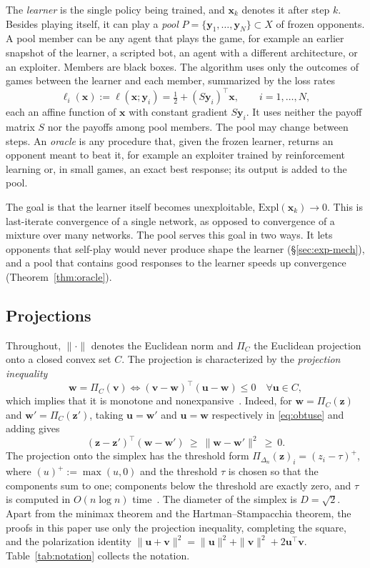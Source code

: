 \documentclass{article}
\theoremstyle{plain}
\theoremstyle{remark}
\newcommand{\Expl}{\mathrm{Expl}}
\newcommand{\Proj}{\Pi}
\newcommand{\simplex}{\Delta}
\newcommand{\bx}{{\bm{x}}}
\newcommand{\by}{{\bm{y}}}
\newcommand{\bv}{{\bm{v}}}
\newcommand{\bw}{{\bm{w}}}
\newcommand{\bz}{{\bm{z}}}
\newcommand{\bu}{{\bm{u}}}
\begin{document}
The \emph{learner} is the single policy being trained, and $\bx_k$ denotes it after step $k$. Besides playing itself, it can play a \emph{pool} $P=\{\by_1,\dots,\by_N\}\subset X$ of frozen opponents. A pool member can be any agent that plays the game, for example an earlier snapshot of the learner, a scripted bot, an agent with a different architecture, or an exploiter. Members are black boxes. The algorithm uses only the outcomes of games between the learner and each member, summarized by the loss rates
\[
\ell_i(\bx):=\ell(\bx;\by_i)=\tfrac12+(S\by_i)^\top\bx ,\qquad i=1,\dots,N,
\]
each an affine function of $\bx$ with constant gradient $S\by_i$. It uses neither the payoff matrix $S$ nor the payoffs among pool members. The pool may change between steps. An \emph{oracle} is any procedure that, given the frozen learner, returns an opponent meant to beat it, for example an exploiter trained by reinforcement learning or, in small games, an exact best response; its output is added to the pool.

The goal is that the learner itself becomes unexploitable, $\Expl(\bx_k)\to0$. This is last-iterate convergence of a single network, as opposed to convergence of a mixture over many networks. The pool serves this goal in two ways. It lets opponents that self-play would never produce shape the learner (\S\ref{sec:exp-mech}), and a pool that contains good responses to the learner speeds up convergence (Theorem~\ref{thm:oracle}).

\subsection{Projections}

Throughout, $\|\cdot\|$ denotes the Euclidean norm and $\Proj_C$ the Euclidean projection onto a closed convex set $C$. The projection is characterized by the \emph{projection inequality}
\begin{equation}
\bw=\Proj_C(\bv)\iff(\bv-\bw)^\top(\bu-\bw)\le0\quad\forall \bu\in C ,
\label{eq:obtuse}
\end{equation}
which implies that it is monotone and nonexpansive~\citep{bauschke2011convex}. Indeed, for $\bw=\Proj_C(\bz)$ and $\bw'=\Proj_C(\bz')$, taking $\bu=\bw'$ and $\bu=\bw$ respectively in \eqref{eq:obtuse} and adding gives
\begin{equation}
(\bz-\bz')^\top(\bw-\bw')\ \ge\ \|\bw-\bw'\|^2\ \ge\ 0 .
\label{eq:monotone}
\end{equation}
The projection onto the simplex has the threshold form $\Proj_{\simplex_n}(\bz)_i=(z_i-\tau)^+$, where $(u)^+:=\max(u,0)$ and the threshold $\tau$ is chosen so that the components sum to one; components below the threshold are exactly zero, and $\tau$ is computed in $O(n\log n)$ time~\citep{duchi2008projection}. The diameter of the simplex is $D=\sqrt2$. Apart from the minimax theorem and the Hartman--Stampacchia theorem, the proofs in this paper use only the projection inequality, completing the square, and the polarization identity $\|\bu+\bv\|^2=\|\bu\|^2+\|\bv\|^2+2\bu^\top\bv$. Table~\ref{tab:notation} collects the notation.
\end{document}

